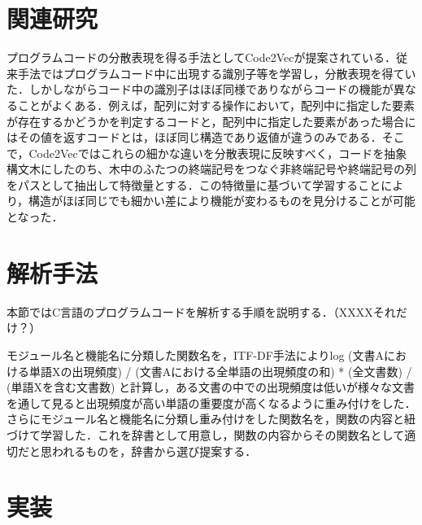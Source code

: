 \documentclass[submit,techrep,noauthor]{ipsj}
\begin{document}
\section{関連研究}

プログラムコードの分散表現を得る手法としてCode2Vec\cite{alon2019code2vec}が提案されている．従来手法ではプログラムコード中に出現する識別子等を学習し，分散表現を得ていた．しかしながらコード中の識別子はほぼ同様でありながらコードの機能が異なることがよくある．例えば，配列に対する操作において，配列中に指定した要素が存在するかどうかを判定するコードと，配列中に指定した要素があった場合にはその値を返すコードとは，ほぼ同じ構造であり返値が違うのみである．そこで，Code2Vecではこれらの細かな違いを分散表現に反映すべく，コードを抽象構文木にしたのち、木中のふたつの終端記号をつなぐ非終端記号や終端記号の列をパスとして抽出して特徴量とする．この特徴量に基づいて学習することにより，構造がほぼ同じでも細かい差により機能が変わるものを見分けることが可能となった．

\section{解析手法}

本節ではC言語のプログラムコードを解析する手順を説明する．（XXXXそれだけ？）

モジュール名と機能名に分類した関数名を，ITF-DF手法により{log (文書Aにおける単語Xの出現頻度) / (文書Aにおける全単語の出現頻度の和)} * {(全文書数) / (単語Xを含む文書数)} と計算し，ある文書の中での出現頻度は低いが様々な文書を通して見ると出現頻度が高い単語の重要度が高くなるように重み付けをした．さらにモジュール名と機能名に分類し重み付けをした関数名を，関数の内容と紐づけて学習した．これを辞書として用意し，関数の内容からその関数名として適切だと思われるものを，辞書から選び提案する．

\section{実装}
\end{document}
